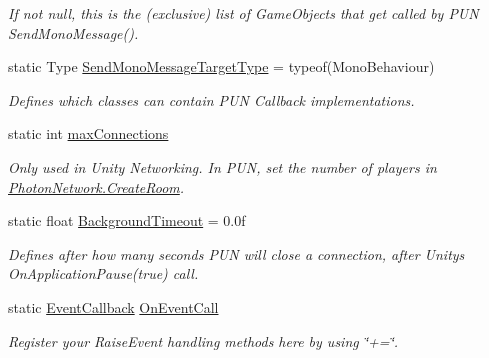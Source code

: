 \begin{DoxyCompactItemize}
\begin{DoxyCompactList}\small\item\em If not null, this is the (exclusive) list of Game\+Objects that get called by P\+UN Send\+Mono\+Message(). \end{DoxyCompactList}\item 
static Type \hyperlink{class_photon_network_a598db34bb93cdb17a3032a96c64b0ce3}{Send\+Mono\+Message\+Target\+Type} = typeof(Mono\+Behaviour)
\begin{DoxyCompactList}\small\item\em Defines which classes can contain P\+UN Callback implementations. \end{DoxyCompactList}\item 
static int \hyperlink{class_photon_network_a7a74751daa6e6e979cff9ba3aceb56dd}{max\+Connections}
\begin{DoxyCompactList}\small\item\em Only used in Unity Networking. In P\+UN, set the number of players in \hyperlink{class_photon_network_a5ab80136622c2ae46b0e4f766e489d74}{Photon\+Network.\+Create\+Room}.\end{DoxyCompactList}\item 
static float \hyperlink{class_photon_network_ae4186352869ef922cb84efbd5c1f2465}{Background\+Timeout} = 0.\+0f
\begin{DoxyCompactList}\small\item\em Defines after how many seconds P\+UN will close a connection, after Unity\textquotesingle{}s On\+Application\+Pause(true) call. \end{DoxyCompactList}\item 
static \hyperlink{class_photon_network_a90ec16d1df1a0332d0ad16493d641f56}{Event\+Callback} \hyperlink{class_photon_network_a81af9e901341d6b647df1f6d7f2d7583}{On\+Event\+Call}
\begin{DoxyCompactList}\small\item\em Register your Raise\+Event handling methods here by using \char`\"{}+=\char`\"{}. \end{DoxyCompactList}\end{DoxyCompactItemize}
